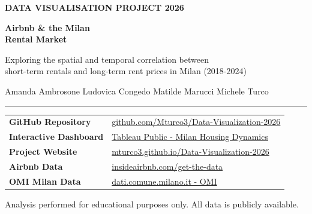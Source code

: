 \documentclass[11pt, a4paper]{article}
\begin{document}
\begin{titlepage}
  \centering
  \vspace*{2cm}

  {\small\textcolor{textmuted}{\textbf{DATA VISUALISATION PROJECT 2026}}\par}
  \vspace{0.8cm}

  {\Huge\bfseries\color{tetti} Airbnb \& the Milan\\ Rental Market\par}
  \vspace{0.5cm}

  {\large\color{textmuted}
    Exploring the spatial and temporal correlation between\\
    short-term rentals and long-term rent prices in Milan (2018-2024)\par}

  \vspace{1cm}
  {\normalsize\color{textmuted}
    Amanda Ambrosone \quad Ludovica Congedo \quad Matilde Marucci \quad Michele Turco\par}

  \vspace{1.5cm}
  \textcolor{tetti}{\rule{0.4\linewidth}{0.8pt}}
  \vspace{1.5cm}

  {\normalsize
  \begin{tabular}{ll}
    \textbf{GitHub Repository} &
      \href{https://github.com/Mturco3/Data-Visualization-2026}%
           {github.com/Mturco3/Data-Visualization-2026} \\[4pt]
    \textbf{Interactive Dashboard} &
      \href{https://public.tableau.com/app/profile/michele.turco/viz/Milan_Housing_Dynamics/Dashboard1}%
           {Tableau Public - Milan Housing Dynamics} \\[4pt]
    \textbf{Project Website} &
      \href{https://mturco3.github.io/Data-Visualization-2026/}%
           {mturco3.github.io/Data-Visualization-2026} \\[4pt]
    \textbf{Airbnb Data} &
      \href{https://insideairbnb.com/get-the-data/}{insideairbnb.com/get-the-data} \\[4pt]
    \textbf{OMI Milan Data} &
      \href{https://dati.comune.milano.it/dataset?tags=OMI}{dati.comune.milano.it - OMI} \\
  \end{tabular}\par}

  \vfill
  {\small\textcolor{textmuted}%
    {Analysis performed for educational purposes only.
     All data is publicly available.}}
\end{titlepage}
\end{document}
